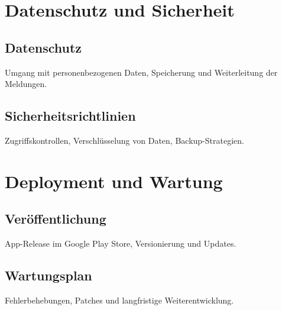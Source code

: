 \section{Datenschutz und Sicherheit}
\subsection{Datenschutz}
Umgang mit personenbezogenen Daten, Speicherung und Weiterleitung der Meldungen.

\subsection{Sicherheitsrichtlinien}
Zugriffskontrollen, Verschlüsselung von Daten, Backup-Strategien.

\section{Deployment und Wartung}
\subsection{Veröffentlichung}
App-Release im Google Play Store, Versionierung und Updates.

\subsection{Wartungsplan}
Fehlerbehebungen, Patches und langfristige Weiterentwicklung.